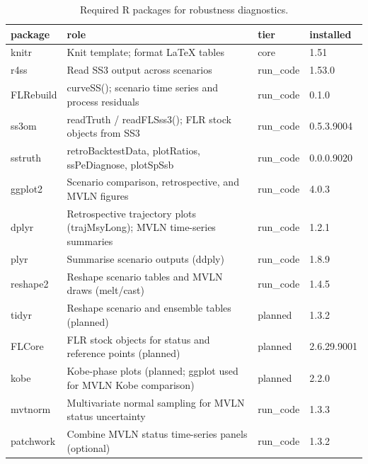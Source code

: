 \begin{table}

\caption{\label{tab:robustness-libraries}Required R packages for robustness diagnostics.}
\centering
\begin{tabular}[t]{llll}
\toprule
package & role & tier & installed\\
\midrule
knitr & Knit template; format LaTeX tables & core & 1.51\\
r4ss & Read SS3 output across scenarios & run\_code & 1.53.0\\
FLRebuild & curveSS(); scenario time series and process residuals & run\_code & 0.1.0\\
ss3om & readTruth / readFLSss3(); FLR stock objects from SS3 & run\_code & 0.5.3.9004\\
sstruth & retroBacktestData, plotRatios, ssPeDiagnose, plotSpSsb & run\_code & 0.0.0.9020\\
\addlinespace
ggplot2 & Scenario comparison, retrospective, and MVLN figures & run\_code & 4.0.3\\
dplyr & Retrospective trajectory plots (trajMsyLong); MVLN time-series summaries & run\_code & 1.2.1\\
plyr & Summarise scenario outputs (ddply) & run\_code & 1.8.9\\
reshape2 & Reshape scenario tables and MVLN draws (melt/cast) & run\_code & 1.4.5\\
tidyr & Reshape scenario and ensemble tables (planned) & planned & 1.3.2\\
\addlinespace
FLCore & FLR stock objects for status and reference points (planned) & planned & 2.6.29.9001\\
kobe & Kobe-phase plots (planned; ggplot used for MVLN Kobe comparison) & planned & 2.2.0\\
mvtnorm & Multivariate normal sampling for MVLN status uncertainty & run\_code & 1.3.3\\
patchwork & Combine MVLN status time-series panels (optional) & run\_code & 1.3.2\\
\bottomrule
\end{tabular}
\end{table}

